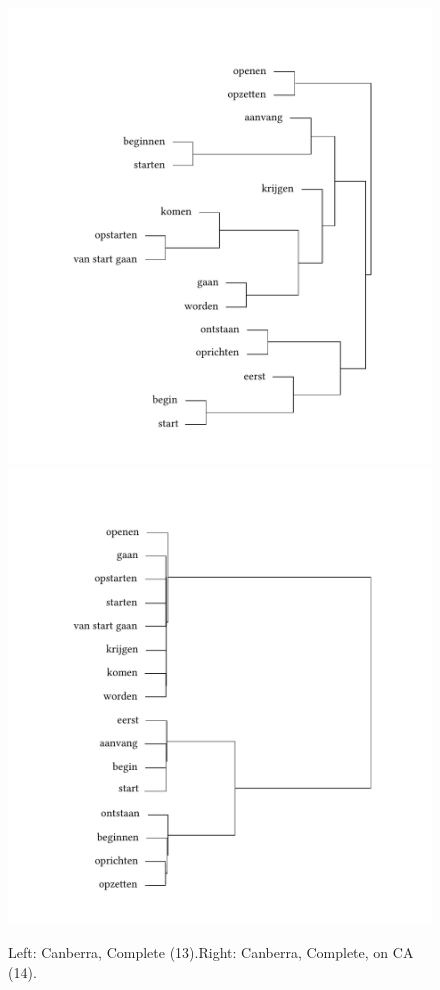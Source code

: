\begin{figure}
\includegraphics[width=.48\textwidth,trim=95 40 75 75]{figures/tree42.pdf}\hfill%
\includegraphics[width=.48\textwidth,trim=95 40 75 75]{figures/tree43.pdf}
\caption{Left:\label{fig:3:42} Canberra, Complete (13).\label{fig:3:43}Right: Canberra, Complete, on CA (14).}
\end{figure}

